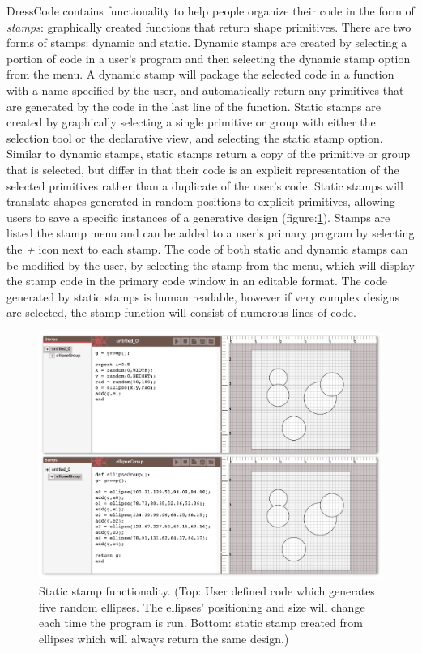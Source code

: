 \documentclass{sigchi}
\begin{document}
DressCode contains functionality to help people organize their code in the form of \textit{stamps}: graphically created functions that return shape primitives. There are two forms of stamps: dynamic and static. Dynamic stamps are created by selecting a portion of code in a user's program and then selecting the dynamic stamp option from the menu. A dynamic stamp will package the selected code in a function with a name specified by the user, and automatically return any primitives that are generated by the code in the last line of the function. Static stamps are created by graphically selecting a single primitive or group with either the selection tool or the declarative view, and selecting the static stamp option. Similar to dynamic stamps, static stamps return a copy of the primitive or group that is selected, but differ in that their code is an explicit representation of the selected primitives rather than a duplicate of the user's code. Static stamps will translate shapes generated in random positions to explicit primitives, allowing users to save a specific instances of a generative design (figure:\ref{fig:stamps}).  Stamps are listed the stamp menu and can be added to a user's primary program by selecting the \textit{+} icon next to each stamp. The code of both static and dynamic stamps can be modified by the user, by selecting the stamp from the menu, which will display the stamp code in the primary code window in an editable format. The code generated by static stamps is human readable, however if very complex designs are selected, the stamp function will consist of numerous lines of code.

\begin{center}
\begin{figure}[h!]
\includegraphics[width=\columnwidth]{images/stamps.jpg}
\caption{Static stamp functionality. (Top: User defined code which generates five random ellipses. The ellipses' positioning and size will change each time the program is run. Bottom: static stamp created from ellipses which will always return the same design.)}
\label{fig:stamps}
\end{figure}
\end{center}
\end{document}
